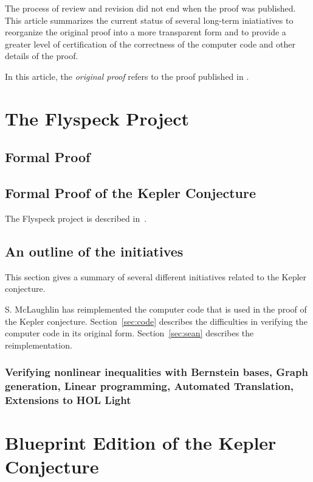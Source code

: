 \documentclass[11pt]{amsart}
\begin{document}
The process of review and revision did not end when the proof was published.
This article summarizes the current status of several long-term iniatiatives to
reorganize the original proof into a more transparent form and to provide a greater
level of certification of the correctness of the computer code and other details of the proof.

In this article, the {\it original proof} refers to the proof published
in \cite{Hales:2006:DCG}.

\section{The Flyspeck Project}

\subsection*{Formal Proof}


\subsection*{Formal Proof of the Kepler Conjecture}

The Flyspeck project is described in~\cite{hales:DSP:2006:432}.


\subsection*{An outline of the initiatives}

This section gives a summary of several different initiatives related to the Kepler conjecture.


S. McLaughlin has reimplemented the computer code that is used in the proof
of the Kepler conjecture.  Section~\ref{sec:code} describes the difficulties
in verifying the computer code in its original form.  Section~\ref{sec:sean}
describes the reimplementation.

\subsubsection*{Verifying nonlinear inequalities with Bernstein bases, Graph generation, Linear programming,
Automated Translation, Extensions to HOL Light}

\section{Blueprint Edition of the Kepler Conjecture}
\end{document}
